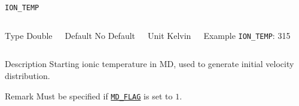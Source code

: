 \documentclass[xcolor=dvipsnames,t]{beamer}
\begin{document}
\begin{frame}[allowframebreaks]{\texttt{ION\_TEMP}} \label{ION_TEMP}
\vspace*{-12pt}
\begin{columns}
\begin{block}{Type}
Double
\end{block}

\begin{block}{Default}
No Default
\end{block}

\begin{block}{Unit}
Kelvin
\end{block}

\begin{block}{Example}
\texttt{ION\_TEMP}: 315
\end{block}
\end{columns}

\begin{block}{Description}
Starting ionic temperature in MD, used to generate initial velocity distribution.
\end{block}

\begin{block}{Remark}
Must be specified if \hyperlink{MD_FLAG}{\texttt{MD\_FLAG}} is set to $1$.
\end{block}

\end{frame}
\end{document}
